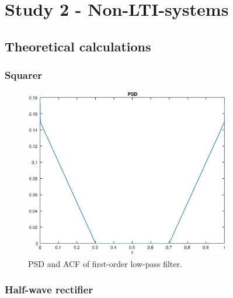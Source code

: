 
\section{Study 2 - Non-LTI-systems}



\subsection{Theoretical calculations}

\subsubsection{Squarer}

\begin{figure}[h]
\centering
\includegraphics[width=0.8\textwidth]{bilder/Lab2/Lab2fig1.eps}
\caption{PSD and ACF of first-order low-pass filter.}
\label{fig:Lab2fig1}
\end{figure}

\subsubsection{Half-wave rectifier}

